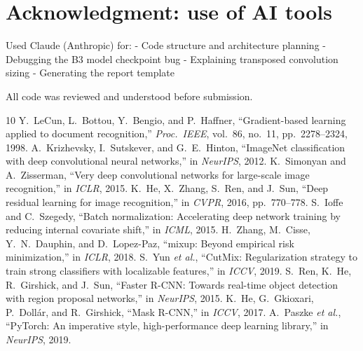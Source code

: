 \documentclass[10pt,twocolumn,letterpaper]{article}
\begin{document}
\section*{Acknowledgment: use of AI tools}

Used Claude (Anthropic) for:
- Code structure and architecture planning
- Debugging the B3 model checkpoint bug
- Explaining transposed convolution sizing
- Generating the report template

All code was reviewed and understood before submission.

\begin{thebibliography}{10}
 Y.~LeCun, L.~Bottou, Y.~Bengio, and P.~Haffner, ``Gradient-based learning applied to document recognition,'' \emph{Proc.\ IEEE}, vol.~86, no.~11, pp.~2278--2324, 1998.
 A.~Krizhevsky, I.~Sutskever, and G.~E.~Hinton, ``ImageNet classification with deep convolutional neural networks,'' in \emph{NeurIPS}, 2012.
 K.~Simonyan and A.~Zisserman, ``Very deep convolutional networks for large-scale image recognition,'' in \emph{ICLR}, 2015.
 K.~He, X.~Zhang, S.~Ren, and J.~Sun, ``Deep residual learning for image recognition,'' in \emph{CVPR}, 2016, pp.~770--778.
 S.~Ioffe and C.~Szegedy, ``Batch normalization: Accelerating deep network training by reducing internal covariate shift,'' in \emph{ICML}, 2015.
 H.~Zhang, M.~Cisse, Y.~N.~Dauphin, and D.~Lopez-Paz, ``mixup: Beyond empirical risk minimization,'' in \emph{ICLR}, 2018.
 S.~Yun \emph{et al.}, ``CutMix: Regularization strategy to train strong classifiers with localizable features,'' in \emph{ICCV}, 2019.
 S.~Ren, K.~He, R.~Girshick, and J.~Sun, ``Faster R-CNN: Towards real-time object detection with region proposal networks,'' in \emph{NeurIPS}, 2015.
 K.~He, G.~Gkioxari, P.~Doll\'ar, and R.~Girshick, ``Mask R-CNN,'' in \emph{ICCV}, 2017.
 A.~Paszke \emph{et al.}, ``PyTorch: An imperative style, high-performance deep learning library,'' in \emph{NeurIPS}, 2019.
\end{thebibliography}
\end{document}
